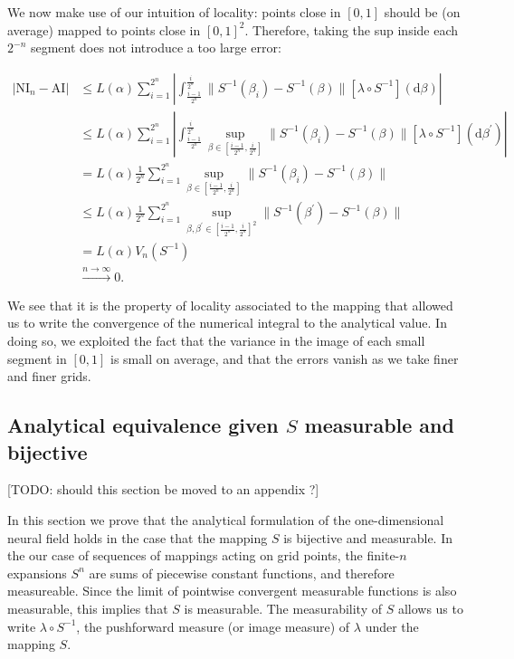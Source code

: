 \documentclass[10pt,letterpaper]{article}
\def\d{\mathrm d}
\newcommand{\norm}[1]{\lVert{#1}\rVert}
\begin{document}
We now make use of our intuition of locality: points close in $[0,1]$ should be (on average) mapped to points close in $[0,1]^2$. Therefore, taking the sup inside each $2^{-n}$ segment does not introduce a too large error:

$$
\begin{aligned}
|\mathrm{NI}_n - \mathrm{AI}| &\leq L(\alpha) \sum_{i=1}^{2^n} \left| \int_{\tfrac{i-1}{2^n}}^{\tfrac{i}{2^n}} \norm{S^{-1}(\beta_i) - S^{-1}(\beta)} \left[\lambda \circ S^{-1}\right](\d \beta) \right| \\
&\leq L(\alpha) \sum_{i=1}^{2^n} \left| \int_{\tfrac{i-1}{2^n}}^{\tfrac{i}{2^n}} \sup_{\beta \in \left[\tfrac{i-1}{2^n}, \tfrac{i}{2^n}\right]} \norm{S^{-1}(\beta_i) - S^{-1}(\beta)} \left[\lambda \circ S^{-1}\right](\d \beta^\prime) \right| \\
&= L(\alpha) \frac{1}{2^n} \sum_{i=1}^{2^n} \sup_{\beta \in \left[\tfrac{i-1}{2^n}, \tfrac{i}{2^n}\right]} \norm{S^{-1}(\beta_i) - S^{-1}(\beta)} \\
&\leq L(\alpha) \frac{1}{2^n} \sum_{i=1}^{2^n} \sup_{\beta, \beta^\prime \in \left[\tfrac{i-1}{2^n}, \tfrac{i}{2^n}\right]^2} \norm{S^{-1}(\beta^\prime) - S^{-1}(\beta)} \\
&= L(\alpha) V_n(S^{-1}) \\
&\xrightarrow{n \to \infty} 0.
\end{aligned}
$$

We see that it is the property of locality associated to the mapping that allowed us to write the convergence of the numerical integral to the analytical value. In doing so, we exploited the fact that the variance in the image of each small segment in $[0,1]$ is small on average, and that the errors vanish as we take finer and finer grids.

\subsection{Analytical equivalence given $S$ measurable and bijective}
\label{sec:proof-equivalence}
[TODO: should this section be moved to an appendix ?]

In this section we prove that the analytical formulation of the one-dimensional neural field holds in the case that the mapping $S$ is bijective and measurable.
In the our case of sequences of mappings acting on grid points, the finite-$n$ expansions $S^n$ are sums of piecewise constant functions, and therefore measureable. Since the limit of pointwise convergent measurable functions is also measurable, this implies that $S$ is measurable. The measurability of $S$ allows us to write $\lambda \circ S^{-1}$, the pushforward measure (or image measure) of $\lambda$ under the mapping $S$.
\end{document}
